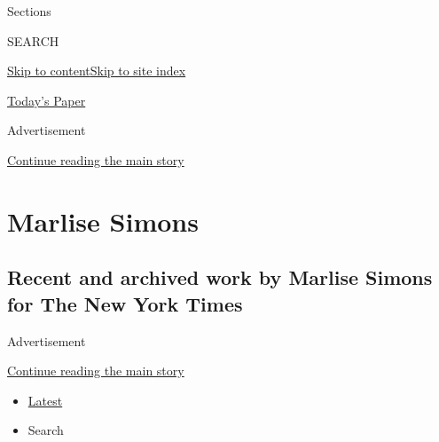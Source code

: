 Sections

SEARCH

\protect\hyperlink{site-content}{Skip to
content}\protect\hyperlink{site-index}{Skip to site index}

\href{https://myaccount.nytimes3xbfgragh.onion/auth/login?response_type=cookie\&client_id=vi}{}

\href{https://www.nytimes3xbfgragh.onion/section/todayspaper}{Today's
Paper}

Advertisement

\protect\hyperlink{after-top}{Continue reading the main story}

\hypertarget{marlise-simons}{%
\section{Marlise Simons}\label{marlise-simons}}

\hypertarget{recent-and-archived-work-by-marlise-simons-for-the-new-york-times}{%
\subsection{Recent and archived work by Marlise Simons for The New York
Times}\label{recent-and-archived-work-by-marlise-simons-for-the-new-york-times}}

Advertisement

\protect\hyperlink{after-mid1}{Continue reading the main story}

\begin{itemize}
\tightlist
\item
  \protect\hyperlink{stream-panel}{Latest}
\item
  Search
\end{itemize}


